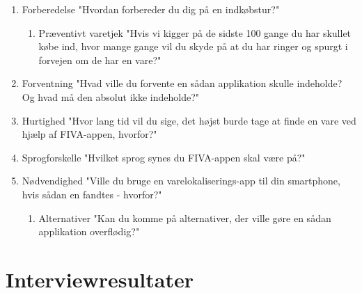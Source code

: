 \documentclass[12pt]{article}
\begin{document}
\begin{enumerate}
\item Forberedelse "Hvordan forbereder du dig på en indkøbstur?"

\begin{enumerate}
\item Præventivt varetjek "Hvis vi kigger på de sidste 100 gange du har skullet købe ind, hvor mange gange vil du skyde på at du har ringer og spurgt i forvejen om de har en vare?"
\end{enumerate}

\item Forventning "Hvad ville du forvente en sådan applikation skulle indeholde? Og hvad må den absolut ikke indeholde?"
\item Hurtighed	"Hvor lang tid vil du sige, det højst burde tage at finde en vare ved hjælp af FIVA-appen, hvorfor?"
\item Sprogforskelle "Hvilket sprog synes du FIVA-appen skal være på?"
\item Nødvendighed "Ville du bruge en varelokaliserings-app til din smartphone, hvis sådan en fandtes - hvorfor?"

\begin{enumerate}
\item Alternativer "Kan du komme på alternativer, der ville gøre en sådan applikation overflødig?"
\end{enumerate}

\end{enumerate}

\section{Interviewresultater}
\end{document}
